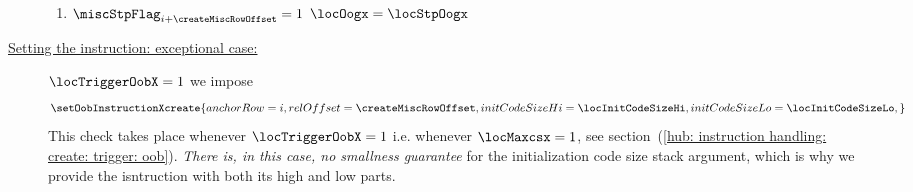 \begin{description}
\begin{enumerate}
			\item \If $\miscStpFlag_{i + \createMiscRowOffset} = 1$ \Then $\locOogx = \locStpOogx$
		\end{enumerate}
	\item[\underline{Setting the \oobMod{} instruction: exceptional case:}]
		\If $\locTriggerOobX = 1$ \Then
		we impose
		\[
			\setOobInstructionXcreate {
				anchorRow      = i                    ,
				relOffset      = \createMiscRowOffset ,
				initCodeSizeHi = \locInitCodeSizeHi   ,
				initCodeSizeLo = \locInitCodeSizeLo   ,
			}
		\]
		\saNote{}
		This check takes place
		whenever $\locTriggerOobX = 1$ i.e.
		whenever $\locMaxcsx      = 1$,
		see section~(\ref{hub: instruction handling: create: trigger: oob}).
		\emph{There is, in this case, no smallness guarantee} for the initialization code size stack argument,
		which is why we provide the \oobMod{} isntruction with both its high and low parts.



\end{description}
